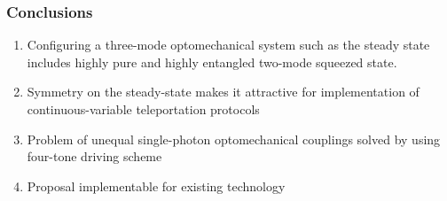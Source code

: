 \documentclass[aspectratio=43]{beamer}
\begin{document}
\begin{frame}

	\frametitle{Conclusions}
	
	\begin{enumerate}
		\item Configuring a three-mode optomechanical system such as the steady state includes highly pure and highly entangled two-mode squeezed state.
		\item Symmetry on the steady-state makes it attractive for implementation of  continuous-variable teleportation protocols
		\item Problem of unequal single-photon optomechanical couplings solved by using four-tone driving scheme
		\item Proposal implementable for existing technology
	\end{enumerate}
		
\end{frame}
\end{document}

